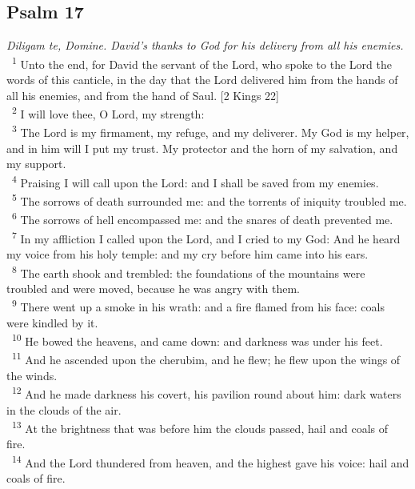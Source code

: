 \documentclass[a5paper,12pt]{article}
\begin{document}
\begin{multicols*}{2}
\section{Psalm 17}
\label{sec:org02864ff}
\emph{Diligam te, Domine. David's thanks to God for his delivery from all his enemies.}\\

~\textsuperscript{1} Unto the end, for David the servant of the Lord, who spoke to the Lord the words of this canticle, in the day that the Lord delivered him from the hands of all his enemies, and from the hand of Saul. [2 Kings 22]\\
~\textsuperscript{2} I will love thee, O Lord, my strength:\\
~\textsuperscript{3} The Lord is my firmament, my refuge, and my deliverer. My God is my helper, and in him will I put my trust. My protector and the horn of my salvation, and my support.\\
~\textsuperscript{4} Praising I will call upon the Lord: and I shall be saved from my enemies.\\
~\textsuperscript{5} The sorrows of death surrounded me: and the torrents of iniquity troubled me.\\
~\textsuperscript{6} The sorrows of hell encompassed me: and the snares of death prevented me.\\
~\textsuperscript{7} In my affliction I called upon the Lord, and I cried to my God: And he heard my voice from his holy temple: and my cry before him came into his ears.\\
~\textsuperscript{8} The earth shook and trembled: the foundations of the mountains were troubled and were moved, because he was angry with them.\\
~\textsuperscript{9} There went up a smoke in his wrath: and a fire flamed from his face: coals were kindled by it.\\
~\textsuperscript{10} He bowed the heavens, and came down: and darkness was under his feet.\\
~\textsuperscript{11} And he ascended upon the cherubim, and he flew; he flew upon the wings of the winds.\\
~\textsuperscript{12} And he made darkness his covert, his pavilion round about him: dark waters in the clouds of the air.\\
~\textsuperscript{13} At the brightness that was before him the clouds passed, hail and coals of fire.\\
~\textsuperscript{14} And the Lord thundered from heaven, and the highest gave his voice: hail and coals of fire.\\

\end{multicols*}
\end{document}
